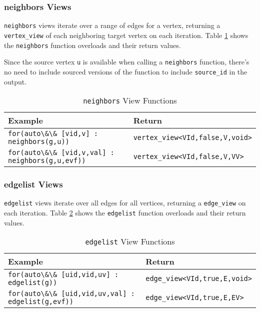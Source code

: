 \documentclass[10pt,onecolumn]{article}
\newcommand{\tcode}[1]{\lstinline[breaklines=true]{#1}}
\begin{document}
\subsubsection{neighbors Views}
\tcode{neighbors} views iterate over a range of edges for a vertex, returning a \tcode{vertex_view} of each neighboring target vertex on each iteration. 
Table \ref{tab:neighbors} shows the \tcode{neighbors} function overloads and their return values. 

Since the source vertex \tcode{u} is available when calling a \tcode{neighbors} function, there's no need to include sourced versions of the function to include \tcode{source_id} in the output.

\begin{table}[h!]
\begin{center}
{\begin{tabular}{l l}
\hline
    \textbf{Example} & \textbf{Return} \\
\hline
    \tcode{for(auto\&\& [vid,v] : neighbors(g,u))} & \tcode{vertex_view<VId,false,V,void>} \\
    \tcode{for(auto\&\& [vid,v,val] : neighbors(g,u,evf))} & \tcode{vertex_view<VId,false,V,VV>} \\
\hline
\end{tabular}}
\caption{\tcode{neighbors} View Functions}
\label{tab:neighbors}
\end{center}
\end{table}

\subsubsection{edgelist Views}
\tcode{edgelist} views iterate over all edges for all vertices, returning a \tcode{edge_view} on each iteration. 
Table \ref{tab:edgelist} shows the \tcode{edgelist} function overloads and their return values. 

\begin{table}[h!]
\begin{center}
{\begin{tabular}{l l}
\hline
    \textbf{Example} & \textbf{Return} \\
\hline
    \tcode{for(auto\&\& [uid,vid,uv] : edgelist(g))} & \tcode{edge_view<VId,true,E,void>} \\
    \tcode{for(auto\&\& [uid,vid,uv,val] : edgelist(g,evf))} & \tcode{edge_view<VId,true,E,EV>} \\
\hline
\end{tabular}}
\caption{\tcode{edgelist} View Functions}
\label{tab:edgelist}
\end{center}
\end{table}
\end{document}
